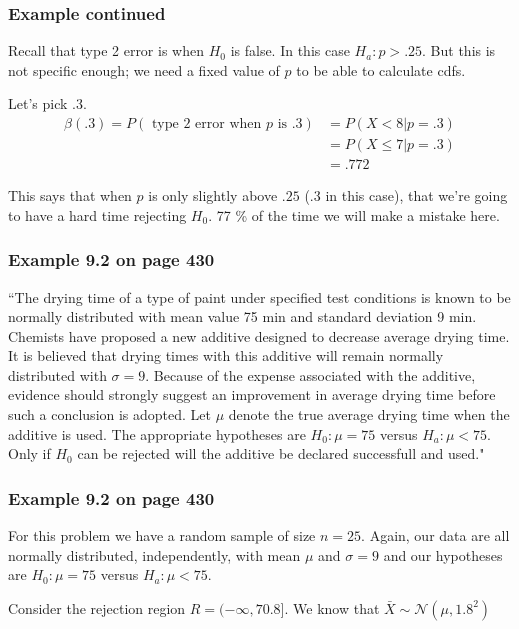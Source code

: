 \documentclass{beamer}
\begin{document}
\begin{frame}
\frametitle{Example continued}

Recall that type 2 error is when $H_0$ is false. In this case $H_a: p > .25$. But this is not specific enough; we need a fixed value of $p$ to be able to calculate cdfs. 
\newline

Let's pick $.3$.
\begin{align*}
\beta(.3) = P(\text{ type 2 error when $p$ is $.3$}) &= P(X < 8 | p = .3) \\
&= P(X \le 7 | p=.3) \\
&= .772
\end{align*}

This says that when $p$ is only slightly above $.25$ ($.3$ in this case), that we're going to have a hard time rejecting $H_0$. 77 \% of the time we will make a mistake here. 

\end{frame}
\begin{frame}
\frametitle{Example 9.2 on page 430}

``The drying time of a type of paint under specified test conditions is known to be normally distributed with mean value 75 min and standard deviation 9 min. Chemists have proposed a new additive designed to decrease average drying time. It is believed that drying times with this additive will remain normally distributed with $\sigma = 9$. Because of the expense associated with the additive, evidence should strongly suggest an improvement in average drying time before such a conclusion is adopted. Let $\mu$ denote the true average drying time when the additive is used. The appropriate hypotheses are $H_0: \mu = 75$ versus $H_a: \mu < 75$. Only if $H_0$ can be rejected will the additive be declared successfull and used."


\end{frame}

\begin{frame}
\frametitle{Example 9.2 on page 430}

For this problem we have a random sample of size $n=25$. Again, our data are all normally distributed, independently, with mean $\mu$ and $\sigma = 9$ and our hypotheses are $H_0: \mu = 75$ versus $H_a: \mu < 75$. 
\newline

Consider the rejection region $R = (-\infty, 70.8]$. We know that $\bar{X} \sim \mathcal{N}(\mu, 1.8^2)$

\end{frame}
\end{document}
